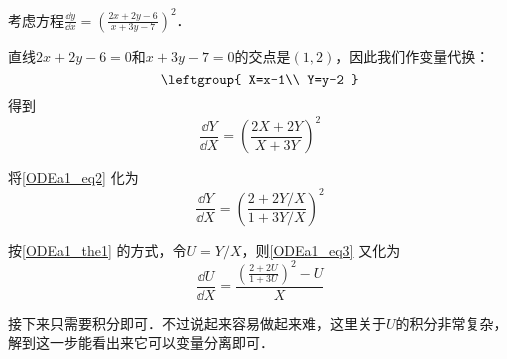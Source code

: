 \begin{example}{}
考虑方程$\frac{\dd y}{\dd x}=(\frac{2x+2y-6}{x+3y-7})^2$．

直线$2x+2y-6=0$和$x+3y-7=0$的交点是$(1, 2)$，因此我们作变量代换：
\begin{equation}
\leftgroup{
    X=x-1\\
    Y=y-2
}
\end{equation}
得到
\begin{equation}\label{ODEa1_eq2}
\frac{\dd Y}{\dd X}=(\frac{2X+2Y}{X+3Y})^2
\end{equation}

将\autoref{ODEa1_eq2} 化为
\begin{equation}\label{ODEa1_eq3}
\frac{\dd Y}{\dd X}=(\frac{2+2Y/X}{1+3Y/X})^2
\end{equation}

按\autoref{ODEa1_the1} 的方式，令$U=Y/X$，则\autoref{ODEa1_eq3} 又化为
\begin{equation}
\frac{\dd U}{\dd X}=\frac{(\frac{2+2U}{1+3U})^2-U}{X}
\end{equation}

接下来只需要积分即可．不过说起来容易做起来难，这里关于$U$的积分非常复杂，解到这一步能看出来它可以变量分离即可．

\end{example}









